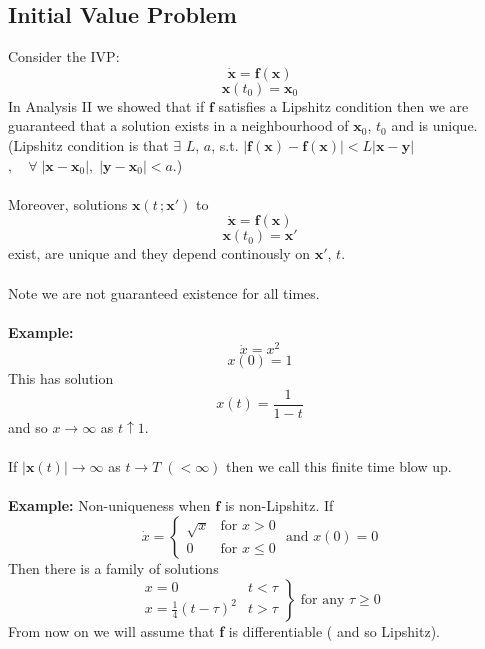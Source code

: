\documentclass{article}
\begin{document}
\subsection{Initial Value Problem}
Consider the IVP: 
\[ \dot{\textbf{x}} = \textbf{f}(\textbf{x})  \]
\[ \textbf{x}(t_0)  = \textbf{x}_0\]
In Analysis II we showed that if $\textbf{f}$ satisfies a Lipshitz condition
then we are guaranteed that a solution exists in a neighbourhood of $\textbf{x}_0$,
$ t_0$ and is unique.
\\
(Lipshitz condition is that $\exists$ $L$, $a$, s.t. 
$|\textbf{f}(\textbf{x})- \textbf{f}(\textbf{x})| < L|\textbf{x} - \textbf{y}|$
$, \quad \forall \; |\textbf{x}-\textbf{x}_0|, \; |\textbf{y}-\textbf{x}_0| < a$.)
\\
\\
Moreover, solutions $\textbf{x}(t \, ; \textbf{x}')$ to 
\[ \dot{\textbf{x}} = \textbf{f}(\textbf{x})  \]
\[ \textbf{x}(t_0)  = \textbf{x}'\]
exist, are unique and they depend continously on $\textbf{x}' , \, t$.
\\
\\
Note we are not guaranteed existence for all times.
\\
\\
\textbf{Example:} 
\[ \dot{x} = x^2  \]
\[ x(0)  = 1\]
This has solution
\[ x(t) = \frac{1}{1-t} \]
and so $x \to \infty$ as $t \uparrow 1$.
\\
\\
If $|\textbf{x}(t)| \to \infty$ as $t \to T \;(< \infty)$ then we call this
finite time blow up.
\\
\\
\textbf{Example:} Non-uniqueness when $\textbf{f}$ is non-Lipshitz. If
\[ \dot{x} = \left\{\begin{array}{lr}
				\sqrt{x} & \mbox{for } x >0 \\
				0        & \mbox{for } x \leq 0
				\end{array}
\right. \mbox{ and } x(0) = 0 \]
Then there is a family of solutions
\[ \left. \begin{array}{lr} 
				x = 0 & t < \tau \\
				x = \frac{1}{4}(t - \tau)^2 & t > \tau
\end{array} \right\} \mbox{ for any } \tau \geq 0 \]
From now on we will assume that \textbf{f} is differentiable ( and so Lipshitz).
\\
\end{document}
